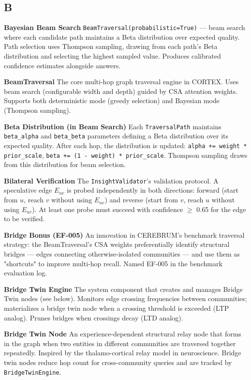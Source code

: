 \documentclass[11pt,article,oneside]{memoir}
\begin{document}
\subsection{B}

\textbf{Bayesian Beam Search}
\texttt{BeamTraversal(probabilistic=True)} — beam search where each candidate path maintains a Beta distr\-ibution over expected quality. Path selection uses Thompson sampling, drawing from each path's Beta distr\-ibution and selecting the highest sampled value. Produces calibrated confidence estimates alongside answers.

\textbf{BeamTraversal}
The core multi-hop graph traversal engine in CORTEX. Uses beam search (confi\-gurable width and depth) guided by CSA attention weights. Supports both deter\-ministic mode (greedy selection) and Bayesian mode (Thompson sampling).

\textbf{Beta Distri\-bution (in Beam Search)}
Each \texttt{TraversalPath} maintains \texttt{beta\_alpha} and \texttt{beta\_beta} parameters defining a Beta distr\-ibution over its expected quality. After each hop, the distr\-ibution is updated: \texttt{alpha += weight * prior\_scale}, \texttt{beta += (1 - weight) * prior\_scale}. Thompson sampling draws from this distr\-ibution for beam selection.

\textbf{Bilateral Verifi\-cation}
The \texttt{InsightValidator}'s validation protocol. A speculative edge $E_{uv}$ is probed indep\-endently in both directions: forward (start from $u$, reach $v$ without using $E_{uv}$) and reverse (start from $v$, reach $u$ without using $E_{uv}$). At least one probe must succeed with confidence $\ge$ 0.65 for the edge to be verified.

\textbf{Bridge Bonus (EF-005)}
An innovation in CEREBRUM's benchmark traversal strategy: the BeamTraversal's CSA weights prefe\-rentially identify structural bridges — edges connecting otherwise-isolated communities — and use them as "shortcuts" to improve multi-hop recall. Named EF-005 in the benchmark evaluation log.

\textbf{Bridge Twin Engine}
The system component that creates and manages Bridge Twin nodes (see below). Monitors edge crossing frequencies between communities; mater\-ializes a bridge twin node when a crossing threshold is exceeded (LTP analog). Prunes bridges when crossings decay (LTD analog).

\textbf{Bridge Twin Node}
An experience-dependent structural relay node that forms in the graph when two entities in different communities are traversed together repeatedly. Inspired by the thalamo-cortical relay model in neuro\-science. Bridge twin nodes reduce hop count for cross-community queries and are tracked by \texttt{BridgeTwinEngine}.
\end{document}
